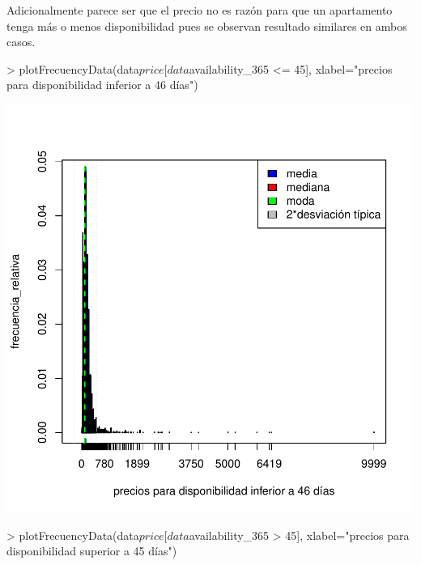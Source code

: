 \documentclass [a4paper] {article}
\begin{document}
Adicionalmente parece ser que el precio no es razón para que un apartamento tenga más o menos disponibilidad pues se observan resultado similares en ambos casos.
\begin{Schunk}
\begin{Sinput}
> plotFrecuencyData(data$price[data$availability_365 <= 45], xlabel="precios para disponibilidad inferior a 46 días")
\end{Sinput}
\end{Schunk}
\includegraphics{entrega-disponibilidad_baja_por_barrios_precio}
\begin{Schunk}
\begin{Sinput}
> plotFrecuencyData(data$price[data$availability_365 > 45], xlabel="precios para disponibilidad superior a 45 días")
\end{Sinput}
\end{Schunk}
\end{document}
